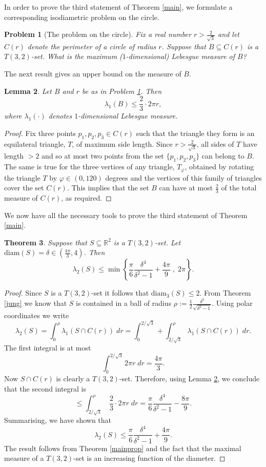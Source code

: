 \documentclass[12pt]{article}
\newtheorem{thm}{Theorem}[section]
\newtheorem{lemma}[thm]{Lemma}
\newtheorem{prbl}[thm]{Problem}
\begin{document}
In order to prove the third statement of Theorem \ref{main}, we formulate 
a corresponding isodiametric problem on the circle.

\begin{prbl}[The problem on the circle]
\label{circle}
Fix a real number $r>\frac{2}{\sqrt{3}}$ and let $C(r)$ denote the perimeter of a circle of radius $r$.
Suppose that $B\subseteq C(r)$  is a $T(3,2)$-set. What is the maximum 
($1$-dimensional) Lebesgue measure of $B$?  \end{prbl}

The next result gives an upper  bound on 
the measure of $B$.

\begin{lemma}
\label{cycle} Let $B$ and $r$ be as in Problem \ref{circle}. Then 
\[ \lambda_1(B) \leq \frac{2}{3}\cdot 2\pi r , \]
where $\lambda_1(\cdot)$ denotes $1$-dimensional Lebesgue measure.
\end{lemma} 
\begin{proof} Fix three points $p_1,p_2,p_3 \in C(r)$ such that the triangle they form is 
an equilateral triangle, $T$, of maximum side length. Since $r>\frac{2}{\sqrt{3}}$, 
all sides of $T$ have length $>2$ and so at most two 
points from the set $\{p_1,p_2,p_3\}$ can belong to $B$. The same 
is true for the three vertices of any triangle, $T_{\varphi}$, obtained 
by rotating the triangle 
$T$ by $\varphi \in (0,120)$ degrees and the vertices of this family of triangles cover the set $C(r)$. 
This implies that the set $B$ can have at most $\frac{2}{3}$ of the total measure of $C(r)$, as required.
\end{proof}

 
We now have all the necessary tools to prove the third statement of Theorem \ref{main}.

\begin{thm}\label{polar} Suppose that $S\subseteq \mathbb{R}^2$ is a $T(3,2)$-set.
Let $\text{diam}(S)=\delta \in \left(\frac{4\pi}{3}, 4\right)$. Then
\[ \lambda_2(S) \leq \min\left\{\frac{\pi}{6}\frac{\delta^4}{\delta^2-1}+\frac{4\pi}{9}\;,\; 2\pi \right\} . \]
\end{thm}
\begin{proof}  Since $S$ is a  $T(3,2)$-set
it follows that $\text{diam}_3(S) \leq2$.
From Theorem \ref{jung} we know that $S$ is contained 
in a ball of radius $\rho := \frac{1}{2}\frac{\delta^2}{\sqrt{\delta^2-1}}$. Using polar coordinates we write
\[ \lambda_2(S)= \int_{0}^{\rho} \lambda_1(S\cap C(r)) \;dr = 
\int_{0}^{2/\sqrt{3}}+ \int_{2/\sqrt{3}}^{\rho} \lambda_1(S\cap C(r)) \;dr.\]
The first integral is at most 
\[\int_{0}^{2/\sqrt{3}}2\pi r\; dr =\frac{4\pi}{3} . \]
Now $S\cap C(r)$ is clearly a $T(3,2)$-set. Therefore,
using Lemma \ref{cycle}, we conclude that the second integral is
\[ \leq  \int_{2/\sqrt{3}}^{\rho} \;\frac{2}{3}\cdot 2\pi r \;dr =
 \frac{\pi}{6}\frac{\delta^4}{\delta^2-1}-\frac{8\pi}{9}. \] 
Summarising, we have shown that
\[\lambda_2(S) \leq \frac{\pi}{6}\frac{\delta^4}{\delta^2-1}+\frac{4\pi}{9}. \]
The result follows from Theorem \ref{mainprop} and the fact that the maximal measure of 
a $T(3,2)$-set  is an increasing function of the diameter.
\end{proof}
\end{document}
